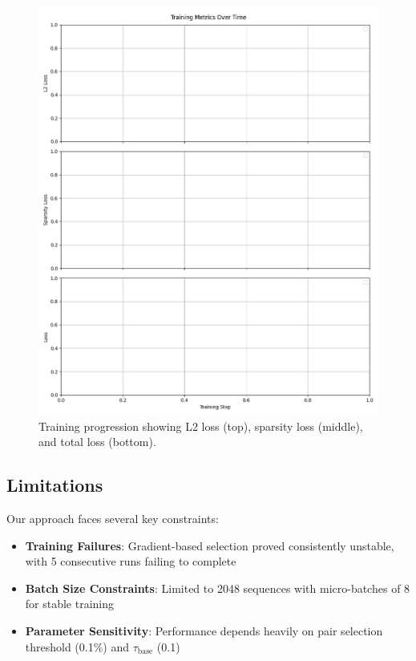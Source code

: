 \documentclass{article} %
\begin{document}
\begin{figure}[h]
    \centering
    \includegraphics[width=\textwidth]{training_metrics.png}
    \caption{Training progression showing L2 loss (top), sparsity loss (middle), and total loss (bottom).}
    \label{fig:training_metrics}
\end{figure}

\subsection{Limitations}
Our approach faces several key constraints:
\begin{itemize}
    \item \textbf{Training Failures}: Gradient-based selection proved consistently unstable, with 5 consecutive runs failing to complete
    \item \textbf{Batch Size Constraints}: Limited to 2048 sequences with micro-batches of 8 for stable training
    \item \textbf{Parameter Sensitivity}: Performance depends heavily on pair selection threshold (0.1\%) and $\tau_{\text{base}}$ (0.1)
\end{itemize}
\end{document}
